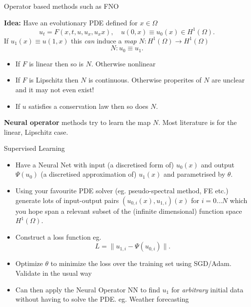 \documentclass{beamer}
\begin{document}
\begin{frame}{Operator based methods such as FNO}

{\bf Idea:}  Have an evolutionary PDE defined for $x \in \Omega$
{\color{blue} $$u_t = F(x,t,u,u_x,u_xx),  \quad u(0,x) \equiv u_0(x) \in H^1(\Omega).$$}
If $u_1(x) \equiv u(1,x)$ this {\em can} induce a {\color{blue} {\em map} } $N: H^1(\Omega) \to H^1(\Omega)$
$$N: u_0  \equiv u_1.$$

\vspace{0.1in}

\begin{itemize}
\item If $F$ is {\color{blue} linear} then so is $N$. Otherwise {\color{red} nonlinear}
\item If $F$ is {\color{blue} Lipschitz} then $N$ is {\color{blue} continuous.}  Otherwise properites of $N$ are {\color{red} unclear} and it may not even exist!
\item If $u$ satisfies  a {\color{blue} conservation law} then so does $N$.
\end{itemize}

\vspace{0.1in}


{\bf Neural operator} methods try to learn the map $N$. Most literature is for the linear, Lipschitz case.
 
\end{frame}

\begin{frame}{Supervised Learning}


\begin{itemize}

\item Have a Neural Net with input (a discretised form of) $u_0(x)$ and output $\Psi(u_0)$  (a discretised approximation of) $u_1(x)$ and parametrised by $\theta$.


\item Using your {\color{blue} favourite PDE solver} (eg. pseudo-spectral method, FE etc.) generate lots of input-output pairs
$(u_{0,i}(x),u_{1,i})(x)$ for $i=0 \ldots N$ which you hope span a relevant subset of the (infinite dimensional) function space $H^1(\Omega)$.

\item Construct a loss function eg.
{\color{blue} $$L = \| u_{1,i} - \Psi(u_{0,i}) \|.$$}

\item {\color{blue} Optimize $\theta$} to minimize the loss over the training set using SGD/Adam. Validate in the usual way

\item Can then apply the {\color{red} Neural Operator} NN to find $u_1$ for {\em arbitrary} initial data without having to solve the PDE.  eg. Weather forecasting

\end{itemize}

\end{frame}
\end{document}

